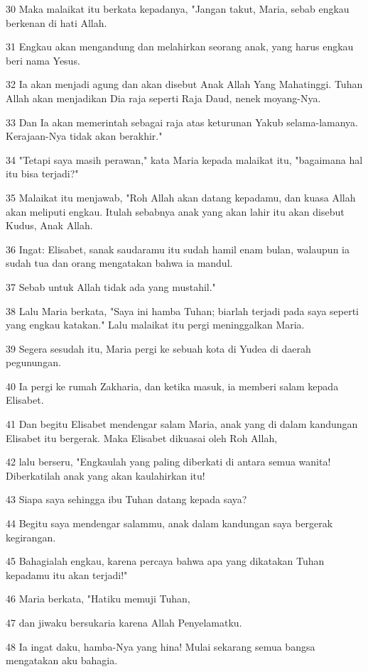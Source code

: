 \par 30 Maka malaikat itu berkata kepadanya, "Jangan takut, Maria, sebab engkau berkenan di hati Allah.
\par 31 Engkau akan mengandung dan melahirkan seorang anak, yang harus engkau beri nama Yesus.
\par 32 Ia akan menjadi agung dan akan disebut Anak Allah Yang Mahatinggi. Tuhan Allah akan menjadikan Dia raja seperti Raja Daud, nenek moyang-Nya.
\par 33 Dan Ia akan memerintah sebagai raja atas keturunan Yakub selama-lamanya. Kerajaan-Nya tidak akan berakhir."
\par 34 "Tetapi saya masih perawan," kata Maria kepada malaikat itu, "bagaimana hal itu bisa terjadi?"
\par 35 Malaikat itu menjawab, "Roh Allah akan datang kepadamu, dan kuasa Allah akan meliputi engkau. Itulah sebabnya anak yang akan lahir itu akan disebut Kudus, Anak Allah.
\par 36 Ingat: Elisabet, sanak saudaramu itu sudah hamil enam bulan, walaupun ia sudah tua dan orang mengatakan bahwa ia mandul.
\par 37 Sebab untuk Allah tidak ada yang mustahil."
\par 38 Lalu Maria berkata, "Saya ini hamba Tuhan; biarlah terjadi pada saya seperti yang engkau katakan." Lalu malaikat itu pergi meninggalkan Maria.
\par 39 Segera sesudah itu, Maria pergi ke sebuah kota di Yudea di daerah pegunungan.
\par 40 Ia pergi ke rumah Zakharia, dan ketika masuk, ia memberi salam kepada Elisabet.
\par 41 Dan begitu Elisabet mendengar salam Maria, anak yang di dalam kandungan Elisabet itu bergerak. Maka Elisabet dikuasai oleh Roh Allah,
\par 42 lalu berseru, "Engkaulah yang paling diberkati di antara semua wanita! Diberkatilah anak yang akan kaulahirkan itu!
\par 43 Siapa saya sehingga ibu Tuhan datang kepada saya?
\par 44 Begitu saya mendengar salammu, anak dalam kandungan saya bergerak kegirangan.
\par 45 Bahagialah engkau, karena percaya bahwa apa yang dikatakan Tuhan kepadamu itu akan terjadi!"
\par 46 Maria berkata, "Hatiku memuji Tuhan,
\par 47 dan jiwaku bersukaria karena Allah Penyelamatku.
\par 48 Ia ingat daku, hamba-Nya yang hina! Mulai sekarang semua bangsa mengatakan aku bahagia.
